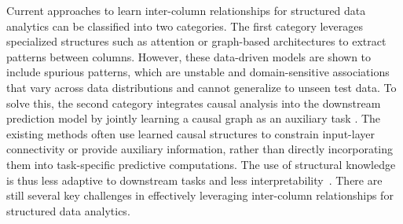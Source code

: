\documentclass[conference]{IEEEtran}
\newcommand{\syadd}[1]{{\color{black}#1}}
\newcommand{\syfix}[1]{{\color{black}#1}}
\newcommand{\syne}[1]{{\color{black}#1}}
\newcommand{\vldb}[1]{{\color{black}#1}}
\newcommand{\syic}[1]{{\color{black}#1}}
\begin{document}
\vldb{
Current approaches to learn inter-column relationships 
for structured data analytics can be classified into two categories.}
The first \vldb{category} leverages specialized structures such as attention \cite{r:tab, r:SAINT} or graph-based architectures \cite{r:gnnbased} to extract patterns between columns. 
However, these data-driven models 
are shown to include spurious patterns\cite{r:superior}, 
\syfix{which are unstable and domain-sensitive
associations that vary across data distributions and cannot generalize to unseen test data.
}
To solve this, the second category integrates causal analysis \vldb{into the downstream prediction model}
by jointly learning a causal graph as an auxiliary task \cite{r:CASTLE,r:linear}. 
\syic{The existing methods often use learned causal structures to constrain input-layer connectivity or provide auxiliary information, rather than directly incorporating them into task-specific predictive computations. 
The use of structural knowledge is thus less adaptive to downstream tasks and less interpretability~\cite{r:linear, r:MLP}.}
There are still several key challenges in effectively leveraging inter-column relationships for structured data \vldb{analytics}.
\end{document}
